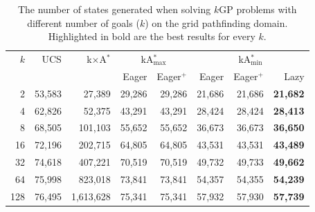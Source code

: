 \documentclass[twoside,11pt]{article}
\newcommand{\kgs}{$k$GP\xspace}
\newcommand{\kastarvar}[1]{\textup{kA}$^*_{#1}$\xspace}
\newcommand{\kastarmin}{\kastarvar{\min}}
\newcommand{\kastarmax}{\kastarvar{\max}}
\newcommand{\kxastar}{k$\times$A$^*$\xspace}
\begin{document}
\begin{table}
  \centering
  \caption{The number of states generated when solving \kgs problems with different number of goals ($k$) on the grid pathfinding domain. Highlighted in bold are the best results for every $k$.}
  \label{tab:pathfinding-generated}
  \begin{tabular}{rrrrrrrr}
    \toprule
    $k$ & UCS & \kxastar & \multicolumn{2}{c}{\kastarmax} & \multicolumn{3}{c}{\kastarmin}\\
    \cmidrule(r){4-5}\cmidrule(l){6-8}
        &     &          & Eager  & Eager$^+$ & Eager  & Eager$^+$ & Lazy\\
    \midrule
    2   & 53,583 & 27,389    & 29,286 & 29,286    & 21,686 & 21,686 & \textbf{21,682}\\
    4   & 62,826 & 52,375    & 43,291 & 43,291    & 28,424 & 28,424 & \textbf{28,413}\\
    8   & 68,505 & 101,103   & 55,652 & 55,652    & 36,673 & 36,673 & \textbf{36,650}\\
    16  & 72,196 & 202,715   & 64,805 & 64,805    & 43,531 & 43,531 & \textbf{43,489}\\
    32  & 74,618 & 407,221   & 70,519 & 70,519    & 49,732 & 49,733 & \textbf{49,662}\\
    64  & 75,998 & 823,018   & 73,841 & 73,841    & 54,357 & 54,355 & \textbf{54,239}\\
    128 & 76,495 & 1,613,628 & 75,341 & 75,341    & 57,932 & 57,930 & \textbf{57,739}\\
    \bottomrule
  \end{tabular}
\end{table}
\end{document}
